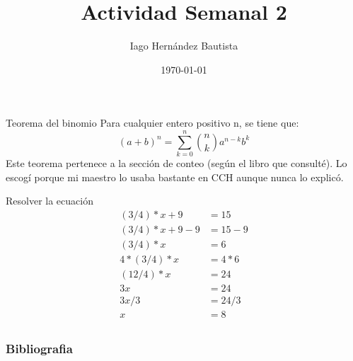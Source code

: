 \documentclass[11pt]{beamer}
\title{Actividad Semanal 2}
\author{Iago Hernández Bautista}
\institute[]{Facultad de Ciencias}
\date[\today]{\today}
\begin{document}
\begin{frame}
  \titlepage
\end{frame}

\begin{frame}{Teorema del binomio \cite{mate}}
  Para cualquier entero positivo n, se tiene que:
  \[
  \displaystyle
  (a+b)^n = \sum_{k=0}^n \binom{n}{k} a^{n-k} b^k
  \]
  Este teorema pertenece a la sección de conteo (según el libro que consulté). Lo escogí porque mi maestro lo usaba bastante en CCH aunque nunca lo explicó.
\end{frame}

\begin{frame}{Resolver la ecuación}
  \begin{align*}
    (3/4) * x + 9 &= 15\\
    (3/4) * x + 9 - 9 &= 15 - 9\\
    (3/4) * x &= 6\\
    4 * (3/4) * x &= 4 * 6\\
    (12/4) * x &= 24\\
    3x &= 24\\
    3x / 3 &= 24 / 3\\
    x &= 8\\
  \end{align*}  
\end{frame}

\begin{frame}[allowframebreaks]
  \frametitle{Bibliografia}
  
  
\end{frame}
\end{document}
